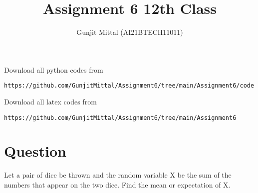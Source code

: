 \documentclass[journal,12pt,twocolumn]{IEEEtran}
\begin{document}
\let\vec\mathbf{}
\def\putbox#1#2#3{\makebox[0in][l]{\makebox[#1][l]{}\raisebox{\baselineskip}[0in][0in]{\raisebox{#2}[0in][0in]{#3}}}}
     \def\rightbox#1{\makebox[0in][r]{#1}}
     \def\centbox#1{\makebox[0in]{#1}}
     \def\topbox#1{\raisebox{-\baselineskip}[0in][0in]{#1}}
     \def\midbox#1{\raisebox{-0.5\baselineskip}[0in][0in]{#1}}
\vspace{3cm}
\title{Assignment 6 12th Class}
\author{Gunjit Mittal (AI21BTECH11011)}
\maketitle
Download all python codes from 
\begin{lstlisting}
https://github.com/GunjitMittal/Assignment6/tree/main/Assignment6/code
\end{lstlisting}
Download all latex codes from 
\begin{lstlisting}
https://github.com/GunjitMittal/Assignment6/tree/main/Assignment6 
\end{lstlisting} 
\section{Question}
Let a pair of dice be thrown and the random variable X be the sum of the
numbers that appear on the two dice. Find the mean or expectation of X.
\end{document}
